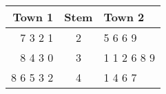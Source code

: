 \documentclass[varwidth]{standalone}
\begin{document}
\begin{table}[htbp]
\begin{tabular}{r|c|l}
\textbf{Town 1} & \textbf{Stem} & \textbf{Town 2}\\[0.024cm]\hline
7 3 2 1 & 2 & 5 6 6 9\\[0.124cm]
8 4 3 0 & 3 & 1 1 2 6 8 9\\[0.124cm]
8 6 5 3 2 & 4 & 1 4 6 7
\end{tabular}
\end{table}
\end{document}
